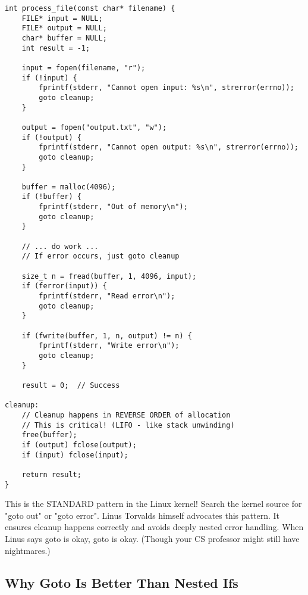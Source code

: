 \begin{lstlisting}
int process_file(const char* filename) {
    FILE* input = NULL;
    FILE* output = NULL;
    char* buffer = NULL;
    int result = -1;

    input = fopen(filename, "r");
    if (!input) {
        fprintf(stderr, "Cannot open input: %s\n", strerror(errno));
        goto cleanup;
    }

    output = fopen("output.txt", "w");
    if (!output) {
        fprintf(stderr, "Cannot open output: %s\n", strerror(errno));
        goto cleanup;
    }

    buffer = malloc(4096);
    if (!buffer) {
        fprintf(stderr, "Out of memory\n");
        goto cleanup;
    }

    // ... do work ...
    // If error occurs, just goto cleanup

    size_t n = fread(buffer, 1, 4096, input);
    if (ferror(input)) {
        fprintf(stderr, "Read error\n");
        goto cleanup;
    }

    if (fwrite(buffer, 1, n, output) != n) {
        fprintf(stderr, "Write error\n");
        goto cleanup;
    }

    result = 0;  // Success

cleanup:
    // Cleanup happens in REVERSE ORDER of allocation
    // This is critical! (LIFO - like stack unwinding)
    free(buffer);
    if (output) fclose(output);
    if (input) fclose(input);

    return result;
}
\end{lstlisting}

\begin{notebox}
This is the STANDARD pattern in the Linux kernel! Search the kernel source for "goto out" or "goto error". Linus Torvalds himself advocates this pattern. It ensures cleanup happens correctly and avoids deeply nested error handling. When Linus says goto is okay, goto is okay. (Though your CS professor might still have nightmares.)
\end{notebox}

\subsection{Why Goto Is Better Than Nested Ifs}

